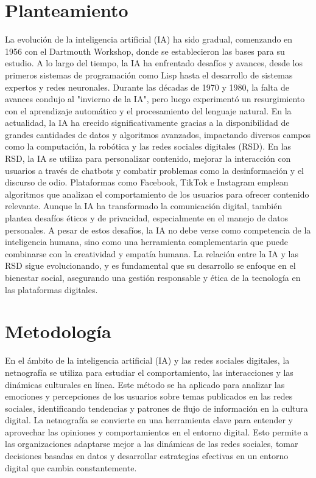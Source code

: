 \documentclass[runningheads]{llncs}
\begin{document}
\section{Planteamiento}
La evolución de la inteligencia artificial (IA) ha sido gradual, comenzando en 1956 con el Dartmouth Workshop, donde se establecieron las bases para su estudio. A lo largo del tiempo, la IA ha enfrentado desafíos y avances, desde los primeros sistemas de programación como Lisp hasta el desarrollo de sistemas expertos y redes neuronales. Durante las décadas de 1970 y 1980, la falta de avances condujo al "invierno de la IA", pero luego experimentó un resurgimiento con el aprendizaje automático y el procesamiento del lenguaje natural. En la actualidad, la IA ha crecido significativamente gracias a la disponibilidad de grandes cantidades de datos y algoritmos avanzados, impactando diversos campos como la computación, la robótica y las redes sociales digitales (RSD).
En las RSD, la IA se utiliza para personalizar contenido, mejorar la interacción con usuarios a través de chatbots y combatir problemas como la desinformación y el discurso de odio. Plataformas como Facebook, TikTok e Instagram emplean algoritmos que analizan el comportamiento de los usuarios para ofrecer contenido relevante. Aunque la IA ha transformado la comunicación digital, también plantea desafíos éticos y de privacidad, especialmente en el manejo de datos personales.
A pesar de estos desafíos, la IA no debe verse como competencia de la inteligencia humana, sino como una herramienta complementaria que puede combinarse con la creatividad y empatía humana. La relación entre la IA y las RSD sigue evolucionando, y es fundamental que su desarrollo se enfoque en el bienestar social, asegurando una gestión responsable y ética de la tecnología en las plataformas digitales.

\section{Metodología}
En el ámbito de la inteligencia artificial (IA) y las redes sociales digitales, la netnografía se utiliza para estudiar el comportamiento, las interacciones y las dinámicas culturales en línea. Este método se ha aplicado para analizar las emociones y percepciones de los usuarios sobre temas publicados en las redes sociales, identificando tendencias y patrones de flujo de información en la cultura digital. 
La netnografía se convierte en una herramienta clave para entender y aprovechar las opiniones y comportamientos en el entorno digital. Esto permite a las organizaciones adaptarse mejor a las dinámicas de las redes sociales, tomar decisiones basadas en datos y desarrollar estrategias efectivas en un entorno digital que cambia constantemente.
\end{document}
